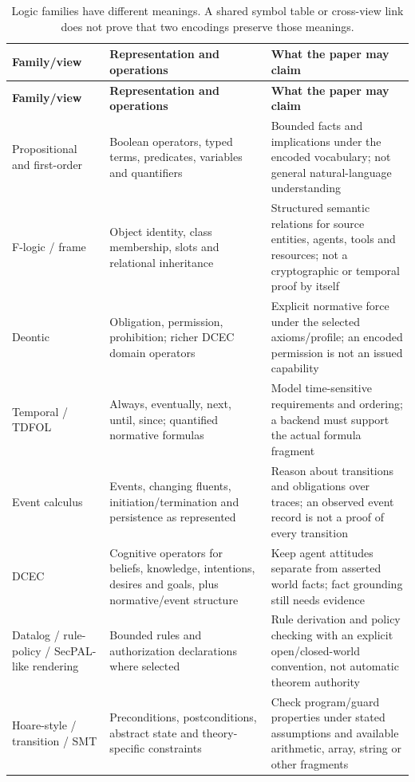 \documentclass{article}
\begin{document}
\begin{longtable}{@{}>{\raggedright\arraybackslash}p{.24\linewidth} >{\raggedright\arraybackslash}p{.32\linewidth} >{\raggedright\arraybackslash}p{.38\linewidth}@{}}
\caption{Logic families have different meanings. A shared symbol table or cross-view link does not prove that two encodings preserve those meanings.}\label{tab:B1}\\
\toprule
\textbf{Family/view} & \textbf{Representation and operations} & \textbf{What the paper may claim} \\
\midrule
\endfirsthead
\textbf{Family/view} & \textbf{Representation and operations} & \textbf{What the paper may claim} \\
\midrule
\endhead
\bottomrule
\endlastfoot
Propositional and first-order & Boolean operators, typed terms, predicates, variables and quantifiers & Bounded facts and implications under the encoded vocabulary; not general natural-language understanding \\[3pt]
F-logic / frame & Object identity, class membership, slots and relational inheritance & Structured semantic relations for source entities, agents, tools and resources; not a cryptographic or temporal proof by itself \\[3pt]
Deontic & Obligation, permission, prohibition; richer DCEC domain operators & Explicit normative force under the selected axioms/profile; an encoded permission is not an issued capability \\[3pt]
Temporal / TDFOL & Always, eventually, next, until, since; quantified normative formulas & Model time-sensitive requirements and ordering; a backend must support the actual formula fragment \\[3pt]
Event calculus & Events, changing fluents, initiation/termination and persistence as represented & Reason about transitions and obligations over traces; an observed event record is not a proof of every transition \\[3pt]
DCEC & Cognitive operators for beliefs, knowledge, intentions, desires and goals, plus normative/event structure & Keep agent attitudes separate from asserted world facts; fact grounding still needs evidence \\[3pt]
Datalog / rule-policy / SecPAL-like rendering & Bounded rules and authorization declarations where selected & Rule derivation and policy checking with an explicit open/closed-world convention, not automatic theorem authority \\[3pt]
Hoare-style / transition / SMT & Preconditions, postconditions, abstract state and theory-specific constraints & Check program/guard properties under stated assumptions and available arithmetic, array, string or other fragments \\[3pt]

\end{longtable}
\end{document}

